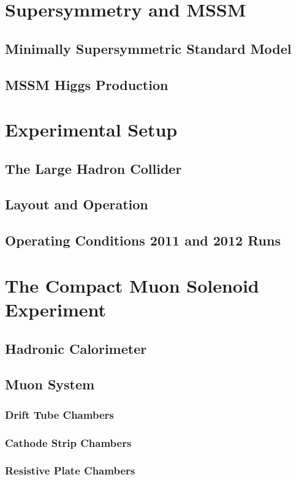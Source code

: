 \documentclass[oneside, letterpaper, 12pt, oldfontcommands]{memoir}
\begin{document}
\chapter{Supersymmetry and MSSM}
\section{Minimally Supersymmetric Standard Model}
\section{MSSM Higgs Production}

\chapter{Experimental Setup}
\section{The Large Hadron Collider}
\section{Layout and Operation}
\section{Operating Conditions 2011 and 2012 Runs}

\chapter{The Compact Muon Solenoid Experiment}
 
 
 
 
 \section{Hadronic Calorimeter}
 \section{Muon System}
  \subsection{Drift Tube Chambers}
  \subsection{Cathode Strip Chambers}
  \subsection{Resistive Plate Chambers}
\end{document}
